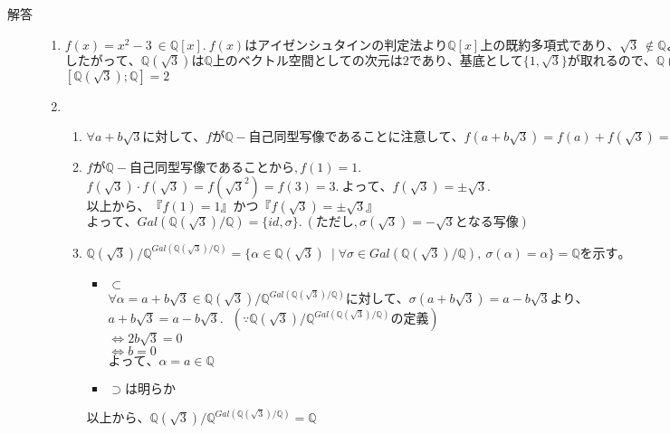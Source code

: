 \documentclass[dvipdfmx]{jsarticle}
\begin{document}
\begin{description}
  \item[解答] \mbox{}
  \begin{enumerate}
    \item $f(x)=x^2-3 \ \in \mathbb{Q}[x]. \ f(x)はアイゼンシュタインの判定法より \mathbb{Q}[x]上の既約多項式であり、\sqrt{3} \ \not \in \mathbb{Q}より、\sqrt{3}の\mathbb{Q}[x]上の最小多項式の次数は2以上. \ よって、f(x)は\mathbb{Q}[x]上の最小多項式.$ \\
    $したがって、\mathbb{Q}(\sqrt{3})は \mathbb{Q}上のベクトル空間としての次元は2であり、基底として\{1,\sqrt{3}\}が取れるので、\mathbb{Q}(\sqrt{3}) = \{ a+b\sqrt{3} \mid a,b \in \mathbb{Q} \}$ \\ $[\mathbb{Q}(\sqrt{3}) ; \mathbb{Q}] = 2$

    \item
    \begin{enumerate}
      \item $\forall a+b\sqrt{3}に対して、fが\mathbb{Q}-自己同型写像であることに注意して、 f(a+b\sqrt{3}) = f(a) + f(\sqrt{3}) = a \cdot f(1) + b \cdot f(\sqrt{3}). \ よって、f(1),f(\sqrt{3})によってfが定まる。$

      \item $fが\mathbb{Q}-自己同型写像であることから,f(1) = 1.$\\
      $f(\sqrt{3}) \cdot f(\sqrt{3}) = f(\sqrt{3}^2) = f(3) = 3. \ よって、f(\sqrt{3}) = \pm \sqrt{3}.$\\
      $以上から、『f(1)=1』かつ『f(\sqrt{3}) = \pm \sqrt{3}』$\\
      $よって、Gal(\mathbb{Q}(\sqrt{3}) / \mathbb{Q}) = \{id,\sigma \}. \ (ただし,\sigma (\sqrt{3}) = -\sqrt{3} となる写像)$

      \item $\mathbb{Q}(\sqrt{3}) / \mathbb{Q}^{Gal(\mathbb{Q}(\sqrt{3}) / \mathbb{Q})} = \{ \alpha \in \mathbb{Q}(\sqrt{3}) \ \mid \forall \sigma \in Gal(\mathbb{Q}(\sqrt{3}) / \mathbb{Q}), \  \sigma(\alpha) = \alpha \} = \mathbb{Q}を示す。$
      \begin{itemize}
        \item $\subset$\\
        $\forall \alpha = a+b\sqrt{3} \in \mathbb{Q}(\sqrt{3}) / \mathbb{Q}^{Gal(\mathbb{Q}(\sqrt{3}) / \mathbb{Q})}に対して、\sigma(a+b\sqrt{3}) = a-b\sqrt{3}より、$\\
        $a+b\sqrt{3} = a-b\sqrt{3}. \ \ \ (\because \mathbb{Q}(\sqrt{3}) / \mathbb{Q}^{Gal(\mathbb{Q}(\sqrt{3}) / \mathbb{Q})}の定義) $\\
        $\Leftrightarrow 2b\sqrt{3} = 0$\\
        $\Leftrightarrow b=0$\\
        $よって、\alpha = a \in \mathbb{Q}$
        \item $\supset　は明らか$
      \end{itemize}
      $以上から、\mathbb{Q}(\sqrt{3}) / \mathbb{Q}^{Gal(\mathbb{Q}(\sqrt{3}) / \mathbb{Q})} = \mathbb{Q}$


\end{enumerate}
\end{enumerate}
\end{description}
\end{document}
